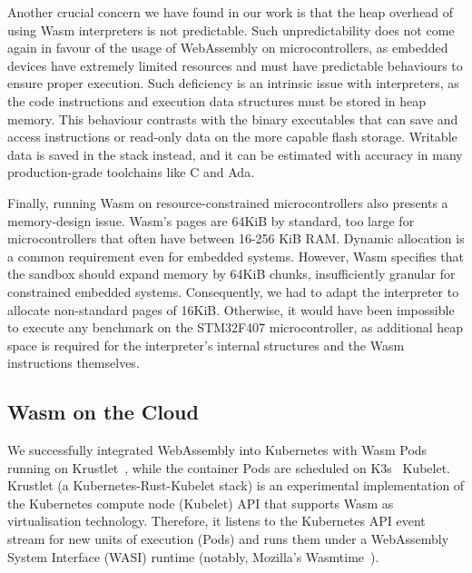 

Another crucial concern we have found in our work is that the heap overhead of using Wasm interpreters is not predictable. Such unpredictability does not come again in favour of the usage of WebAssembly on microcontrollers, as embedded devices have extremely limited resources and must have predictable behaviours to ensure proper execution. Such deficiency is an intrinsic issue with interpreters, as the code instructions and execution data structures must be stored in heap memory. This behaviour contrasts with the binary executables that can save and access instructions or read-only data on the more capable flash storage. Writable data is saved in the stack instead, and it can be estimated with accuracy in many production-grade toolchains like C and Ada.

Finally, running Wasm on resource-constrained microcontrollers also presents a memory-design issue. Wasm's pages are 64KiB by standard, too large for microcontrollers that often have between 16-256 KiB RAM. Dynamic allocation is a common requirement even for embedded systems. However, Wasm specifies that the sandbox should expand memory by 64KiB chunks, insufficiently granular for constrained embedded systems. Consequently, we had to adapt the interpreter to allocate non-standard pages of 16KiB. Otherwise, it would have been impossible to execute any benchmark on the STM32F407 microcontroller, as additional heap space is required for the interpreter's internal structures and the Wasm instructions themselves.

\subsection{Wasm on the Cloud}

We successfully integrated WebAssembly into Kubernetes with Wasm Pods running on Krustlet~\cite{krustlet}, while the container Pods are scheduled on K3s~\cite{k3s} Kubelet. Krustlet (a Kubernetes-Rust-Kubelet stack) is an experimental implementation of the Kubernetes compute node (Kubelet) API that supports Wasm as virtualisation technology. Therefore, it listens to the Kubernetes API event stream for new units of execution (Pods) and runs them under a WebAssembly System Interface (WASI) runtime (notably, Mozilla's Wasmtime~\cite{wasmtime}).

